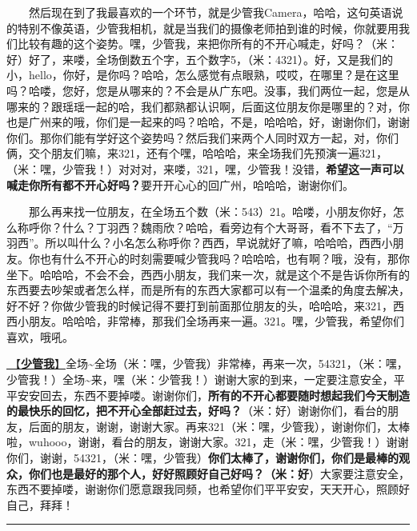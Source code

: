 \documentclass[]{ctexbook}
\begin{document}
  然后现在到了我最喜欢的一个环节，就是少管我Camera，哈哈，这句英语说的特别不像英语，少管我相机，就是当我们的摄像老师拍到谁的时候，你就要用我们比较有趣的这个姿势。嘿，少管我，来把你所有的不开心喊走，好吗？（米：好）好了，来喽，全场倒数五个字，五个数字5，（米：4321）。好，又是我们的小，hello，你好，是你吗？哈哈，怎么感觉有点眼熟，哎哎，在哪里？是在这里吗？哈喽，您好，您是从哪来的？不会是从广东吧。没事，我们两位一起，您是从哪来的？跟瑶瑶一起的哈，我们都熟都认识啊，后面这位朋友你是哪里的？对，你也是广州来的哦，你们是一起来的吗？哈哈，不是，哈哈哈，好，谢谢你们，谢谢你们。那你们能有学好这个姿势吗？然后我们来两个人同时双方一起，对，你们俩，交个朋友们嘛，来321，还有个嘿，哈哈哈，来全场我们先预演一遍321，（米：嘿，少管我！）对对对，来喽，321，嘿，少管我！没错，\textbf{希望这一声可以喊走你所有都不开心好吗？}要开开心心的回广州，哈哈哈，谢谢你们。

  那么再来找一位朋友，在全场五个数（米：543）21。哈喽，小朋友你好，怎么称呼你？什么？丁羽西？魏雨欣？哈哈，看旁边有个大哥哥，看不下去了，``万羽西''。所以叫什么？小名怎么称呼你？西西，早说就好了嘛，哈哈哈，西西小朋友。你也有什么不开心的时刻需要喊少管我吗？哈哈哈，也有啊？哦，没有，那你坐下。哈哈哈，不会不会，西西小朋友，我们来一次，就是这个不是告诉你所有的东西要去吵架或者怎么样，而是所有的东西大家都可以有一个温柔的角度去解决，好不好？你做少管我的时候记得不要打到前面那位朋友的头，哈哈哈，来321，西西小朋友。哈哈哈，非常棒，那我们全场再来一遍。321。嘿，少管我，希望你们喜欢，哦吼。

\hyperref[watch-ur-manners]{🎵【\textbf{少管我}】}全场\textasciitilde 全场（米：嘿，少管我）非常棒，再来一次，54321，（米：嘿，少管我！）全场\textasciitilde 来，嘿（米：少管我！）谢谢大家的到来，一定要注意安全，平平安安回去，东西不要掉喽。谢谢你们，\textbf{所有的不开心都要随时想起我们今天制造的最快乐的回忆，把不开心全部赶过去，好吗？}（米：好）谢谢你们，看台的朋友，后面的朋友，谢谢，谢谢大家。再来321（米：嘿，少管我），谢谢你们，太棒啦，wuhooo，谢谢，看台的朋友，谢谢大家。321，走（米：嘿，少管我！）谢谢你们，谢谢，54321，（米：嘿，少管我）\textbf{你们太棒了，谢谢你们，你们是最棒的观众，你们也是最好的那个人，好好照顾好自己好吗？（米：好}）大家要注意安全，东西不要掉喽，谢谢你们愿意跟我同频，也希望你们平平安安，天天开心，照顾好自己，拜拜！

\begin{center}\rule{0.5\linewidth}{0.5pt}\end{center}
\end{document}
